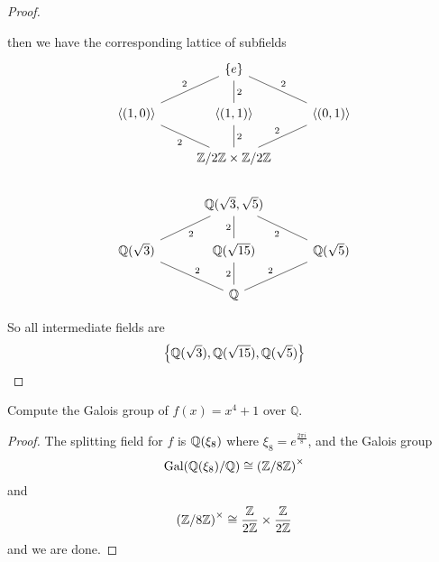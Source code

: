 \begin{proof}
\begin{itemize}
\begin{equation*}
        \end{equation*}
        then we have the corresponding lattice of subfields
        \[\begin{tikzcd}
            & {\{e\}} \\
            {\langle(1,0)\rangle} & {\langle(1,1)\rangle} & {\langle(0,1)\rangle} \\
            & {\Z/2\Z\times\Z/2\Z} \\
            & {\mathbb{Q}(\sqrt{3},\sqrt{5})} \\
            {\mathbb{Q}(\sqrt{3})} & {\mathbb{Q}(\sqrt{15})} & {\mathbb{Q}(\sqrt{5})} \\
            & {\mathbb{Q}}
            \arrow["2", no head, from=2-1, to=1-2]
            \arrow["2"', no head, from=2-1, to=3-2]
            \arrow["2"', no head, from=2-2, to=1-2]
            \arrow["2", no head, from=2-2, to=3-2]
            \arrow["2"', no head, from=2-3, to=1-2]
            \arrow["2", no head, from=3-2, to=2-3]
            \arrow["2"', no head, from=5-1, to=4-2]
            \arrow["2", no head, from=5-2, to=4-2]
            \arrow["2", no head, from=5-3, to=4-2]
            \arrow["2"', no head, from=6-2, to=5-1]
            \arrow["2", no head, from=6-2, to=5-2]
            \arrow["2", no head, from=6-2, to=5-3]
        \end{tikzcd}\]
    \end{itemize}
    So all intermediate fields are 
    \begin{equation*}
        \left\{\mathbb{Q}(\sqrt{3}), \mathbb{Q}(\sqrt{15}),\mathbb{Q}(\sqrt{5})\right\}
    \end{equation*}
\end{proof}




\begin{prob}[F2013-Q5]
    Compute the Galois group of \(f(x) = x^4 + 1\) over \(\mathbb{Q}\).
\end{prob}
\begin{proof}
    The splitting field for $f$ is $\mathbb{Q}(\xi_8)$ where $\xi_8=e^\frac{2\pi i}{8}$, and the Galois group 
    \begin{equation*}
        \text{Gal}(\mathbb{Q}(\xi_8)/\mathbb{Q})\cong\left(\mathbb{Z}/8\mathbb{Z}\right)^\times
    \end{equation*}
    and
    \begin{equation*}
        \left(\mathbb{Z}/8\mathbb{Z}\right)^\times\cong\frac{\mathbb{Z}}{2\mathbb{Z}}\times\frac{\mathbb{Z}}{2\mathbb{Z}}
    \end{equation*}
    and we are done.
\end{proof}



